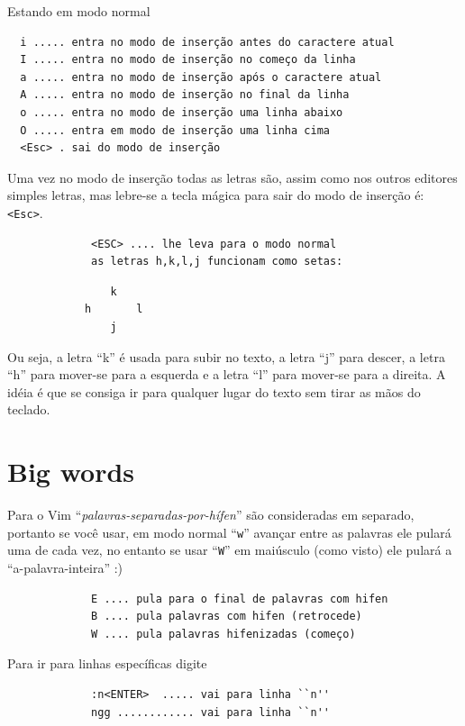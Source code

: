 \documentclass[10pt,a4paper,openany]{book}
\begin{document}
Estando em modo normal

\begin{verbatim}
  i ..... entra no modo de inserção antes do caractere atual
  I ..... entra no modo de inserção no começo da linha
  a ..... entra no modo de inserção após o caractere atual
  A ..... entra no modo de inserção no final da linha
  o ..... entra no modo de inserção uma linha abaixo
  O ..... entra em modo de inserção uma linha cima
  <Esc> . sai do modo de inserção
\end{verbatim}

Uma vez no modo de inserção todas as letras são, assim como nos outros
editores simples letras, mas lebre-se a tecla mágica para sair do modo
de inserção é: \verb+<Esc>+.

\begin{verbatim}
			 <ESC> .... lhe leva para o modo normal
			 as letras h,k,l,j funcionam como setas:
\end{verbatim}

\begin{verbatim}
				k
			h		l
				j
\end{verbatim}

Ou seja, a letra ``k'' é usada para subir no texto, a letra ``j'' para
descer, a letra ``h'' para mover-se para a esquerda e a letra ``l''
para mover-se para a direita. A idéia é que se consiga ir para
qualquer lugar do texto sem tirar as mãos do teclado.



\section{Big words}
\label{Big word's}

Para o Vim ``{\em{palavras-separadas-por-hífen}}'' são consideradas em separado, portanto se você usar,
em modo normal ``\verb+w+'' avançar entre as palavras ele pulará uma de
cada vez, no entanto se usar ``\verb+W+''
em maiúsculo (como visto) ele pulará a ``a-palavra-inteira'' :)

\begin{verbatim}
			 E .... pula para o final de palavras com hifen
			 B .... pula palavras com hifen (retrocede)
			 W .... pula palavras hifenizadas (começo)
\end{verbatim}



Para ir para linhas específicas digite

\begin{verbatim}
			 :n<ENTER>  ..... vai para linha ``n''
			 ngg ............ vai para linha ``n''
\end{verbatim}
\end{document}
